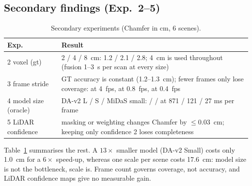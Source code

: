 \subsection{Secondary findings (Exp.~2--5)}\label{sec:secondary}
\begin{table}[t]
\centering\small
\caption{Secondary experiments (Chamfer in cm, 6 scenes).}
\label{tab:secondary}
\begin{tabularx}{\columnwidth}{@{}lX@{}}
\toprule
Exp. & Result \\
\midrule
2 voxel (gt) & 2 / 4 / \SI{8}{cm}: 1.2 / 2.1 / 2.8; \SI{4}{cm} is used throughout (fusion 1--\SI{3}{s} per scan at every size) \\
3 frame stride & GT accuracy is constant (1.2--\SI{1.3}{cm}); fewer frames only lose coverage: \fscore{} \rsSTRGTONEF{} at 4~fps, \rsSTRGTFIVEF{} at 0.8~fps, \rsSTRGTTENF{} at 0.4~fps \\
4 model size (oracle) & DA-v2 L / S / MiDaS small: \rsDALARGECM{} / \rsDASMALLCM{} / \rsMIDASCM{} at 871 / 121 / 27 ms per frame \\
5 LiDAR confidence & masking or weighting changes Chamfer by $\leq$\SI{0.03}{cm}; keeping only confidence 2 loses completeness \\
\bottomrule
\end{tabularx}
\end{table}
Table~\ref{tab:secondary} summarises the rest. A $13\times$ smaller model (DA-v2 Small) costs only \SI{1.0}{cm} for a
$6\times$ speed-up, whereas one scale per scene costs \SI{17.6}{cm}: model size is not the bottleneck, scale is.
Frame count governs coverage, not accuracy, and LiDAR confidence maps give no measurable gain.
